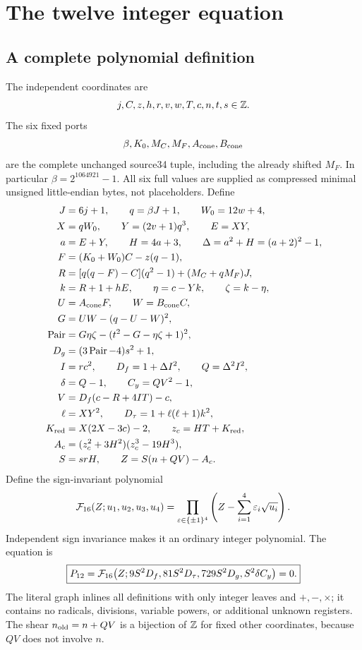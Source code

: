 \section{The twelve integer equation}\label{sec:norm}
\subsection{A complete polynomial definition}
The independent coordinates are
\[j,C,z,h,r,v,w,T,c,n,t,s\in\mathbb Z.\]
The six fixed ports
\[\beta,K_0,M_C,M_F,A_{\rm cone},B_{\rm cone}\]
are the complete unchanged source34 tuple, including the already shifted $M_F$. In particular $\beta=2^{1064921}-1$. All six full values are supplied as compressed minimal unsigned little-endian bytes, not placeholders. Define
\begin{align*}
 J&=6j+1,\qquad q=\beta J+1,\qquad W_0=12w+4,\\
 X&=qW_0,\qquad Y=(2v+1)q^3,\qquad E=XY,\\
 a&=E+Y,\qquad H=4a+3,\qquad \Delta=a^2+H=(a+2)^2-1,\\
 F&=(K_0+W_0)C-z(q-1),\\
 R&=[q(q-F)-C](q^2-1)+(M_C+qM_F)J,\\
 k&=R+1+hE,\qquad \eta=c-Yk,\qquad \zeta=k-\eta,\\
 U&=A_{\rm cone}F,\qquad W=B_{\rm cone}C,\\
 G&=UW-(q-U-W)^2,\\
 \operatorname{Pair}&=G\eta\zeta-(t^2-G-\eta\zeta+1)^2,\\
 D_g&=(3\operatorname{Pair}-4)s^2+1,\\
 I&=rc^2,\qquad D_f=1+\Delta I^2,\qquad Q=\Delta^2I^2,\\
 \delta&=Q-1,\qquad C_y=QV^2-1,\\
 V&=D_f(c-R+4IT)-c,\\
 \ell&=XY^2,\qquad D_\tau=1+\ell(\ell+1)k^2,\\
 K_{\mathrm{red}}&=X(2X-3c)-2,\qquad z_c=HT+K_{\mathrm{red}},\\
 A_c&=(z_c^2+3H^2)(z_c^3-19H^3),\\
 S&=srH,\qquad Z=S(n+QV)-A_c.
\end{align*}
Define the sign-invariant polynomial
\[
 \mathcal F_{16}(Z;u_1,u_2,u_3,u_4)
 =\prod_{\varepsilon\in\{\pm1\}^4}
 \left(Z-\sum_{i=1}^4\varepsilon_i\sqrt{u_i}\right).
\]
Independent sign invariance makes it an ordinary integer polynomial. The equation is
\begin{equation}\label{eq:mainnorm}
 \boxed{P_{12}=\mathcal F_{16}
 \bigl(Z;9S^2D_f,81S^2D_\tau,729S^2D_g,S^2\delta C_y\bigr)=0.}
\end{equation}
The literal graph inlines all definitions with only integer leaves and $+,-,\times$; it contains no radicals, divisions, variable powers, or additional unknown registers. The shear $n_{\rm old}=n+QV$ is a bijection of $\mathbb Z$ for fixed other coordinates, because $QV$ does not involve $n$.

